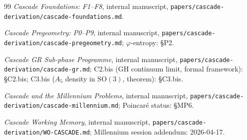 \documentclass[11pt, a4paper]{amsart}
\theoremstyle{definition}
\begin{document}
\begin{thebibliography}{99}
\emph{Cascade Foundations: F1--F8}, internal manuscript,
\texttt{papers/cascade-derivation/cascade-foundations.md}.

\emph{Cascade Pregeometry: P0--P9}, internal manuscript,
\texttt{papers/cascade-derivation/cascade-pregeometry.md};
$\varphi$-entropy: \S P2.

\emph{Cascade GR Sub-phase Programme}, internal manuscript,
\texttt{papers/cascade-derivation/cascade-gr.md}; C2.bis (GH
continuum limit, formal framework): \S C2.bis; C3.bis ($A_{5}$
density in $\mathrm{SO}(3)$, theorem): \S C3.bis.

\emph{Cascade and the Millennium Problems}, internal manuscript,
\texttt{papers/cascade-derivation/cascade-millennium.md};
Poincar\'{e} status: \S MP6.

\emph{Cascade Working Memory}, internal manuscript,
\texttt{papers/cascade-derivation/WO-CASCADE.md}; Millennium
session addendum: 2026-04-17.

\end{thebibliography}
\end{document}
